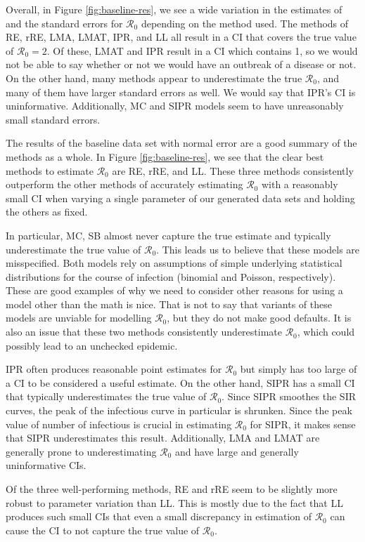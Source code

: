 \documentclass[12pt]{article}
\newcommand{\rr}{\ensuremath{\mathcal{R}_0}}
\begin{document}
Overall, in Figure \ref{fig:baseline-res}, we see a wide variation in the estimates of and the standard errors for $\rr$ depending on the method used.  The methods of RE, rRE, LMA, LMAT, IPR, and LL all result in a CI that covers the true value of $\rr=2$.  Of these, LMAT and IPR result in a CI which contains 1, so we would not be able to say whether or not we would have an outbreak of a disease or not. On the other hand, many methods appear to underestimate the true $\rr$, and many of them have larger standard errors as well.  We would say that IPR's CI is uninformative. Additionally, MC and SIPR models seem to have unreasonably small standard errors.

The results of the baseline data set with normal error are a good summary of the methods as a whole.  In Figure \ref{fig:baseline-res}, we see that the clear best methods to estimate $\rr$ are RE, rRE, and LL.  These three methods consistently outperform the other methods of accurately estimating $\rr$ with a reasonably small CI when varying a single parameter of our generated data sets and holding the others as fixed.

In particular, MC, SB almost never capture the true estimate and typically underestimate the true value of $\rr$.  This leads us to believe that these models are misspecified.  Both models rely on assumptions of simple underlying statistical distributions for the course of infection (binomial and Poisson, respectively).  These are good examples of why we need to consider other reasons for using a model other than the math is nice.  That is not to say that variants of these models are unviable for modelling $\rr$, but they do not make good defaults.  It is also an issue that these two methods consistently underestimate $\rr$, which could possibly lead to an unchecked epidemic.

IPR often produces reasonable point estimates for $\rr$ but simply has too large of a CI to be considered a useful estimate.  On the other hand, SIPR has a small CI that typically underestimates the true value of $\rr$.  Since SIPR smoothes the SIR curves, the peak of the infectious curve in particular is shrunken.  Since the peak value of number of infectious is crucial in estimating $\rr$ for SIPR, it makes sense that SIPR underestimates this result.  Additionally, LMA and LMAT are generally prone to underestimating $\rr$ and have large and generally uninformative CIs.

Of the three well-performing methods, RE and rRE seem to be slightly more robust to parameter variation than LL.  This is mostly due to the fact that LL produces such small CIs that even a small discrepancy in estimation of $\rr$ can cause the CI to not capture the true value of $\rr$.
\end{document}
